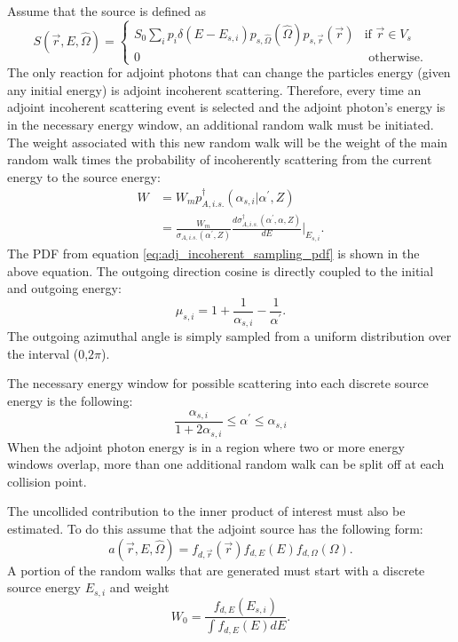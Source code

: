 Assume that the source is defined as
\begin{equation}
  S(\vec{r},E,\hat{\Omega}) = 
  \begin{cases}
    S_0 \sum_i p_i \delta(E - E_{s,i}) p_{s,\hat{\Omega}}(\hat{\Omega})
    p_{s,\vec{r}}(\vec{r}) & \text{if } \vec{r} \in V_s \\
    0 & \text{ otherwise}.
  \end{cases}
\end{equation}
The only reaction for adjoint photons that can change the particles energy 
(given any initial energy) is adjoint incoherent scattering. Therefore,
every time an adjoint incoherent scattering event is selected and the adjoint 
photon's energy is in the necessary energy window, an additional random walk 
must be initiated. The weight associated with this new random walk will be the 
weight of the main random walk times the probability of incoherently scattering 
from the current energy to the source energy:
\begin{align}
  W & = W_m p_{A,i.s.}^{\dagger}(\alpha_{s,i}|\alpha^{'},Z) \nonumber \\
  & = \frac{W_m}{\sigma_{A,i.s.}(\alpha^{'},Z)}
  \frac{d\sigma_{A,i.s.}^{\dagger}(\alpha^{'},\alpha,Z)}{dE}\Big|_{E_{s,i}}.
\end{align}
The PDF from equation \ref{eq:adj_incoherent_sampling_pdf} is shown in the 
above equation. The outgoing direction cosine is directly coupled to the 
initial and outgoing energy:
\begin{equation}
  \mu_{s,i} = 1 + \frac{1}{\alpha_{s,i}} - \frac{1}{\alpha^{'}}.
\end{equation}
The outgoing azimuthal angle is simply sampled from a uniform distribution
over the interval (0,$2\pi$). 

The necessary energy window for possible scattering into each discrete source
energy is the following:
\begin{equation}
  \frac{\alpha_{s,i}}{1+2\alpha_{s,i}} \leq \alpha^{'} \leq \alpha_{s,i}
\end{equation}
When the adjoint photon energy is in a region where two or more energy windows
overlap, more than one additional random walk can be split off at each 
collision point.


The uncollided contribution to the inner product of interest must
also be estimated. To do this assume that the adjoint source has the following
form:
\begin{equation}
  a(\vec{r},E,\hat{\Omega}) = f_{d,\vec{r}}(\vec{r})f_{d,E}(E)f_{d,\Omega}(\Omega).
\end{equation}
A portion of the random walks that are generated must start with a discrete
source energy $E_{s,i}$ and weight
\begin{equation}
  W_0 = \frac{f_{d,E}(E_{s,i})}{\int f_{d,E}(E) dE}.
\end{equation} 

